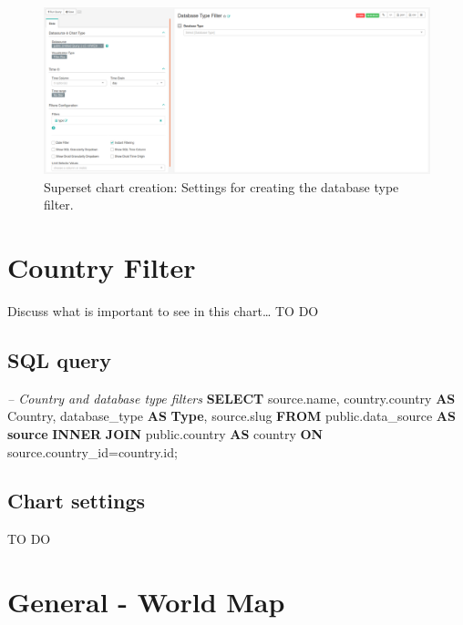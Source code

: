 \documentclass[]{book}
\newenvironment{Shaded}{\begin{snugshade}}{\end{snugshade}}
\newcommand{\KeywordTok}[1]{\textcolor[rgb]{0.13,0.29,0.53}{\textbf{#1}}}
\newcommand{\CommentTok}[1]{\textcolor[rgb]{0.56,0.35,0.01}{\textit{#1}}}
\newcommand{\NormalTok}[1]{#1}
\begin{document}
\begin{figure}
\includegraphics[width=1\linewidth]{images/databaseTypeFilter} \caption{Superset chart creation: Settings for creating the database type filter.}\label{fig:databaseTypeFilter}
\end{figure}

\section{Country Filter}\label{country-filter}

Discuss what is important to see in this chart\ldots{} TO DO

\subsection{SQL query}\label{sql-query-1}

\begin{Shaded}
\begin{Highlighting}[]
\CommentTok{--  Country and database type filters}
\KeywordTok{SELECT}\NormalTok{ source.name, }
\NormalTok{       country.country }\KeywordTok{AS}\NormalTok{ Country, }
\NormalTok{       database_type }\KeywordTok{AS} \KeywordTok{Type}\NormalTok{,}
\NormalTok{       source.slug}
\KeywordTok{FROM}\NormalTok{ public.data_source }\KeywordTok{AS} \KeywordTok{source} \KeywordTok{INNER} \KeywordTok{JOIN}\NormalTok{ public.country }
    \KeywordTok{AS}\NormalTok{ country }\KeywordTok{ON}\NormalTok{ source.country_id=country.id;}
\end{Highlighting}
\end{Shaded}

\subsection{Chart settings}\label{chart-settings-1}

TO DO

\section{General - World Map}\label{general---world-map}
\end{document}
